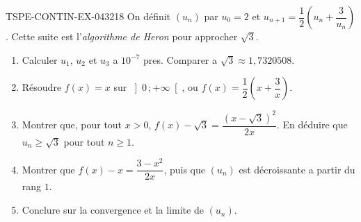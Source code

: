 \begin{exercice}{TSPE-CONTIN-EX-043}{2}{18}
On définit $(u_n)$ par $u_0 = 2$ et $u_{n+1} = \dfrac{1}{2}\left(u_n + \dfrac{3}{u_n}\right)$. Cette suite est l'\emph{algorithme de Heron} pour approcher $\sqrt3$.
\begin{enumerate}
  \item Calculer $u_1$, $u_2$ et $u_3$ a $10^{-7}$ pres. Comparer a $\sqrt3 \approx 1{,}7320508$.
  \item Résoudre $f(x) = x$ sur $\left]0\,;+\infty\right[$, ou $f(x) = \dfrac{1}{2}\left(x + \dfrac{3}{x}\right)$.
  \item Montrer que, pour tout $x > 0$, $f(x) - \sqrt3 = \dfrac{\left(x - \sqrt3\right)^2}{2x}$. En déduire que $u_n \geq \sqrt3$ pour tout $n \geq 1$.
  \item Montrer que $f(x) - x = \dfrac{3 - x^2}{2x}$, puis que $(u_n)$ est décroissante a partir du rang $1$.
  \item Conclure sur la convergence et la limite de $(u_n)$.
\end{enumerate}
\end{exercice}
